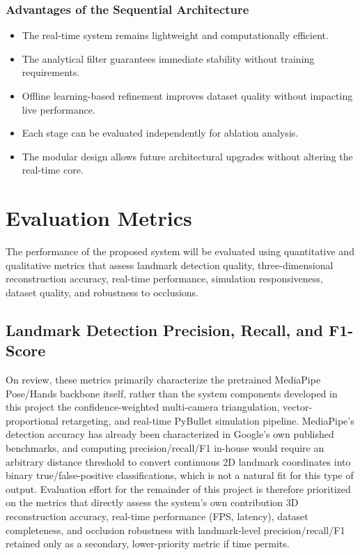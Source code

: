 \subsubsection{Advantages of the Sequential Architecture}

\begin{itemize}
    \item The real-time system remains lightweight and computationally efficient.
    \item The analytical filter guarantees immediate stability without training requirements.
    \item Offline learning-based refinement improves dataset quality without impacting live performance.
    \item Each stage can be evaluated independently for ablation analysis.
    \item The modular design allows future architectural upgrades without altering the real-time core.
\end{itemize}

\section{Evaluation Metrics}

The performance of the proposed system will be evaluated using quantitative and qualitative metrics that assess landmark detection quality, three-dimensional reconstruction accuracy, real-time performance, simulation responsiveness, dataset quality, and robustness to occlusions.

\subsection{Landmark Detection Precision, Recall, and F1-Score}

On review, these metrics primarily characterize the pretrained MediaPipe Pose/Hands backbone itself, rather
than the system components developed in this project  the
confidence-weighted multi-camera triangulation, vector-proportional
retargeting, and real-time PyBullet simulation pipeline. MediaPipe's
detection accuracy has already been characterized in Google's own
published benchmarks, and computing precision/recall/F1 in-house would
require an arbitrary distance threshold to convert continuous 2D landmark
coordinates into binary true/false-positive classifications, which is not
a natural fit for this type of output. Evaluation effort for the
remainder of this project is therefore prioritized on the metrics that
directly assess the system's own contribution  3D reconstruction
accuracy, real-time performance (FPS, latency), dataset completeness, and
occlusion robustness with
landmark-level precision/recall/F1 retained only as a secondary,
lower-priority metric if time permits.

